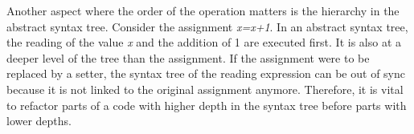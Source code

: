Another aspect where the order of the operation matters is the hierarchy in the abstract syntax tree. Consider the assignment \textit{x=x+1}. In an abstract syntax tree, the reading of the value \textit{x} and the addition of 1 are executed first. It is also at a deeper level of the tree than the assignment. If the assignment were to be replaced by a setter, the syntax tree of the reading expression can be out of sync because it is not linked to the original assignment anymore. Therefore, it is vital to refactor parts of a code with higher depth in the syntax tree before parts with lower depths. 

